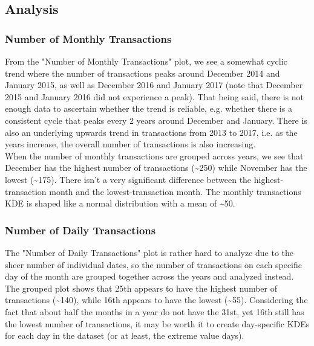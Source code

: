 \documentclass[11pt]{article}
\begin{document}
    \begin{center}
    \end{center}
    
    \subsection{Analysis}

\subsubsection{Number of Monthly Transactions}

From the "Number of Monthly Transactions" plot, we see a somewhat cyclic
trend where the number of transactions peaks around December 2014 and
January 2015, as well as December 2016 and January 2017 (note that
December 2015 and January 2016 did not experience a peak). That being
said, there is not enough data to ascertain whether the trend is
reliable, e.g. whether there is a consistent cycle that peaks every 2
years around December and January. There is also an underlying upwards
trend in transactions from 2013 to 2017, i.e. as the years increase, the
overall number of transactions is also increasing.\\

When the number of monthly transactions are grouped across years, we see
that December has the highest number of transactions
(\textasciitilde{}250) while November has the lowest
(\textasciitilde{}175). There isn't a very significant difference
between the highest-transaction month and the lowest-transaction month.
The monthly transactions KDE is shaped like a normal distribution with a
mean of \textasciitilde{}50.

\subsubsection{Number of Daily Transactions}

The "Number of Daily Transactions" plot is rather hard to analyze due to
the sheer number of individual dates, so the number of transactions on
each specific day of the month are grouped together across the years and
analyzed instead. The grouped plot shows that 25th appears to have the
highest number of transactions (\textasciitilde{}140), while 16th
appears to have the lowest (\textasciitilde{}55). Considering the fact
that about half the months in a year do not have the 31st, yet 16th
still has the lowest number of transactions, it may be worth it to
create day-specific KDEs for each day in the dataset (or at least, the
extreme value days).\\
\end{document}
